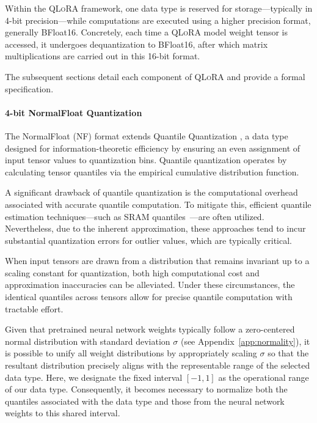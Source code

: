 Within the \textsc{QLoRA} framework, one data type is reserved for storage—typically in 4-bit precision—while computations are executed using a higher precision format, generally BFloat16. Concretely, each time a \textsc{QLoRA} model weight tensor is accessed, it undergoes dequantization to BFloat16, after which matrix multiplications are carried out in this 16-bit format.

The subsequent sections detail each component of \textsc{QLoRA} and provide a formal specification.

\paragraph{4-bit NormalFloat Quantization} The NormalFloat (NF) format extends Quantile Quantization \citep{dettmers2022optimizers}, a data type designed for information-theoretic efficiency by ensuring an even assignment of input tensor values to quantization bins. Quantile quantization operates by calculating tensor quantiles via the empirical cumulative distribution function.

A significant drawback of quantile quantization is the computational overhead associated with accurate quantile computation. To mitigate this, efficient quantile estimation techniques—such as SRAM quantiles~\citep{dettmers2022optimizers}—are often utilized. Nevertheless, due to the inherent approximation, these approaches tend to incur substantial quantization errors for outlier values, which are typically critical.

When input tensors are drawn from a distribution that remains invariant up to a scaling constant for quantization, both high computational cost and approximation inaccuracies can be alleviated. Under these circumstances, the identical quantiles across tensors allow for precise quantile computation with tractable effort.

Given that pretrained neural network weights typically follow a zero-centered normal distribution with standard deviation $\sigma$ (see Appendix~\ref{app:normality}), it is possible to unify all weight distributions by appropriately scaling $\sigma$ so that the resultant distribution precisely aligns with the representable range of the selected data type. Here, we designate the fixed interval $[-1, 1]$ as the operational range of our data type. Consequently, it becomes necessary to normalize both the quantiles associated with the data type and those from the neural network weights to this shared interval.


